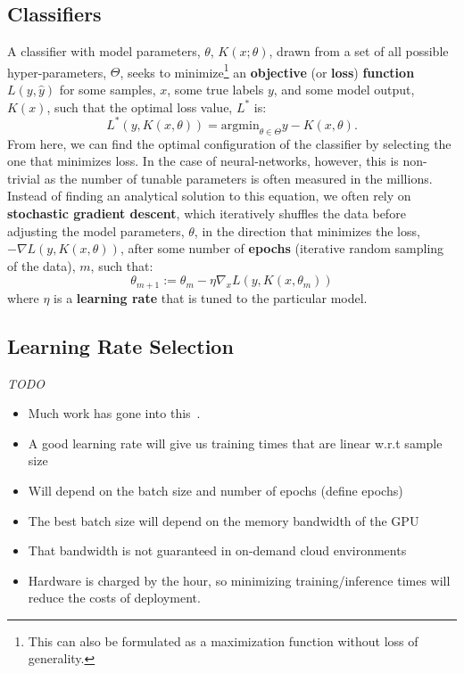 \documentclass[conference]{IEEEtran}
\newcommand{\cm}[1]{\textit{{\color{blue}#1}}}
\begin{document}
\subsection{Classifiers}

A classifier with model parameters, $\theta$, $K(x; \theta)$, drawn from a set of all possible hyper-parameters, $\Theta$, seeks to minimize\footnote{This can also be formulated as a maximization function without loss of generality.} an \textbf{objective} (or \textbf{loss}) \textbf{function} $L(y, \hat{y})$ for some samples, $x$, some true labels $y$, and some model output, $K(x)$, such that the optimal loss value, $L^*$ is:
\[
L^*(y, K(x, \theta)) = \mathrm{argmin}_{\theta \in \Theta} y - K(x, \theta).
\]
From here, we can find the optimal configuration of the classifier by selecting the one that minimizes loss. In the case of neural-networks, however, this is non-trivial as the number of tunable parameters is often measured in the millions. Instead of finding an analytical solution to this equation, we often rely on \textbf{stochastic gradient descent}, which iteratively shuffles the data before adjusting the model parameters, $\theta$, in the direction that minimizes the loss, $-\nabla L(y, K(x, \theta))$, after some number of \textbf{epochs} (iterative random sampling of the data), $m$, such that:
\begin{equation}
\theta_{m+1} := \theta_{m} - \eta \nabla_x L(y, K(x, \theta_m))
\label{eq:sgd}
\end{equation}
where $\eta$ is a \textbf{learning rate} that is tuned to the particular model. 

\subsection{Learning Rate Selection}
\label{learning_rate}
\cm{TODO}
\begin{itemize}
    \item Much work has gone into this~\cite{}.
    \item A good learning rate will give us training times that are linear w.r.t sample size ~\cite{}
    \item Will depend on the batch size and number of epochs (define epochs) ~\cite{}
    \item The best batch size will depend on the memory bandwidth of the GPU~\cite{}
    \item That bandwidth is not guaranteed in on-demand cloud environments~\cite{}
    \item Hardware is charged by the hour, so minimizing training/inference times will reduce the costs of deployment.
\end{itemize}
\end{document}
